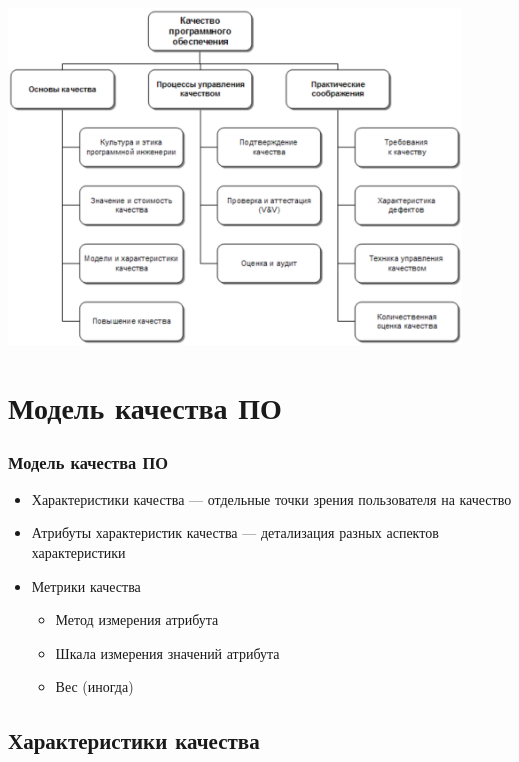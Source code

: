 \documentclass{../../slides-style}
\begin{document}
    \begin{frame}
        \begin{center}
            \includegraphics[width=0.9\textwidth]{quality.png}
        \end{center}
    \end{frame}

    \section{Модель качества ПО}

    \begin{frame}
        \frametitle{Модель качества ПО}
        \begin{itemize}
            \item Характеристики качества --- отдельные точки зрения пользователя на качество
            \item Атрибуты характеристик качества --- детализация разных аспектов характеристики
            \item Метрики качества
            \begin{itemize}
                \item Метод измерения атрибута
                \item Шкала измерения значений атрибута
                \item Вес (иногда)
            \end{itemize}
        \end{itemize}
    \end{frame}

    \subsection{Характеристики качества}
\end{document}

